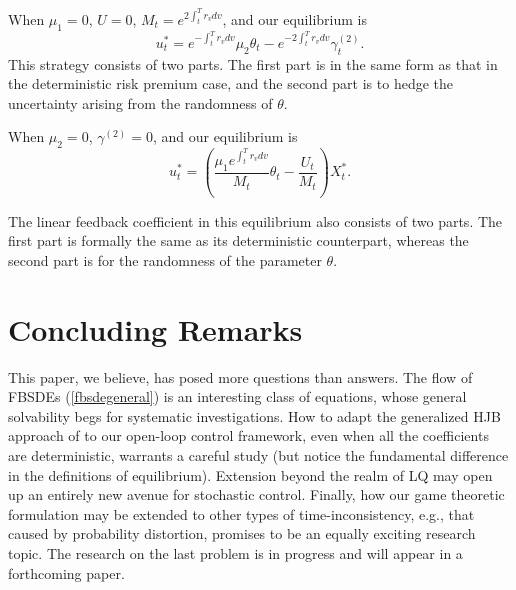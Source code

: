 \documentclass[final]{siamltex}
\begin{document}
\medskip


When $\mu_1=0$, $U=0$, $M_t=e^{2\int_t^T r_vdv}$, and our equilibrium is
$$u_t^*=e^{-\int_t^T r_vdv}\mu_2\theta_t- e^{-2\int_t^T r_vdv}\gamma^{(2)}_t.$$
This strategy consists of two parts. The first part is in the same form as
that in the deterministic risk premium case, and the second part is to hedge the uncertainty arising from the randomness
of $\theta$.

\medskip


When $\mu_2=0$, $\gamma^{(2)}=0$, and our equilibrium is
$$u_t^*=\left(\frac{\mu_1e^{\int_t^T r_vdv}}{M_t}\theta_t-\frac{U_t}{M_t}\right)X_t^*.$$

The linear feedback coefficient in this  equilibrium also consists of two parts.
The first part is formally the same as its deterministic counterpart, whereas the
second part is for the randomness of the parameter $\theta$.

\section{Concluding Remarks}

This paper, we believe, has posed more questions than answers. The flow of FBSDEs (\ref{fbsdegeneral}) is an interesting class of equations, whose
general solvability begs for systematic  investigations. How to adapt the generalized HJB approach of \cite{BM,BMZ} to our open-loop control
framework, even when all the coefficients are
deterministic, warrants a careful study (but notice the fundamental difference in the definitions of equilibrium). Extension beyond the realm of
LQ may open up an entirely new avenue for stochastic control. Finally, how our game theoretic formulation may be extended to other types of
time-inconsistency, e.g., that caused by probability distortion, promises to be an equally exciting research topic. The research on the last 
problem is in progress and will appear in a forthcoming paper. 
\end{document}
